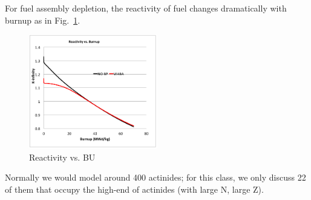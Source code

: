 \documentclass{school-22.211-notes}
\date{April 11, 2012}
\begin{document}
\maketitle

 \label{fuel-depletion}
For fuel assembly depletion, the reactivity of fuel changes dramatically with burnup as in Fig.~\ref{rho-vs-BU}. 

\begin{figure}[h]
  \centering
  \includegraphics[width=0.5\textwidth]{images/dfs/rho-vs-BU.png}
  \caption{Reactivity vs. BU} \label{rho-vs-BU}
\end{figure}

Normally we would model around 400 actinides; for this class, we only discuss 22 of them that occupy the high-end of actinides (with large N, large Z). 
\end{document}
